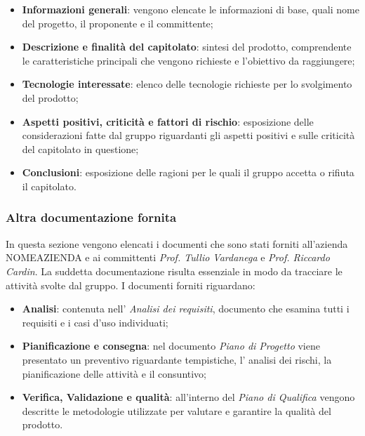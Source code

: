 \begin{itemize}

\item \textbf{Informazioni generali}: vengono elencate le informazioni di base,  quali nome del progetto,  il proponente e il committente;

\item \textbf{Descrizione e finalità del capitolato}: sintesi del prodotto, comprendente le caratteristiche principali che vengono richieste e l'obiettivo da raggiungere;

\item \textbf{Tecnologie interessate}: elenco delle tecnologie richieste per lo svolgimento del prodotto;

\item \textbf{Aspetti positivi,  criticità e fattori di rischio}: esposizione delle considerazioni fatte dal gruppo riguardanti gli aspetti positivi e sulle criticità del capitolato in questione;

\item \textbf{Conclusioni}: esposizione delle ragioni per le quali il gruppo accetta o rifiuta il capitolato.

\end{itemize}

\subsubsection{Altra documentazione fornita}

In questa sezione vengono elencati i documenti che sono stati forniti all'azienda NOMEAZIENDA e ai committenti \textit{Prof. Tullio Vardanega} e \textit{Prof.  Riccardo Cardin}.  La suddetta documentazione risulta essenziale in modo da tracciare le attività  svolte dal gruppo.
I documenti forniti riguardano: 
\begin{itemize}

\item \textbf{Analisi}: contenuta nell' \textit{Analisi dei requisiti},  documento che esamina tutti i requisiti e i casi d'uso individuati;
\item \textbf{Pianificazione e consegna}: nel documento \textit{Piano di Progetto} viene presentato un preventivo riguardante tempistiche,  l' analisi dei rischi, la pianificazione delle attività e il consuntivo;
\item \textbf{Verifica,  Validazione e qualità}: all'interno del \textit{Piano di Qualifica} vengono descritte le metodologie utilizzate per valutare e garantire la qualità del prodotto.

\end{itemize}

